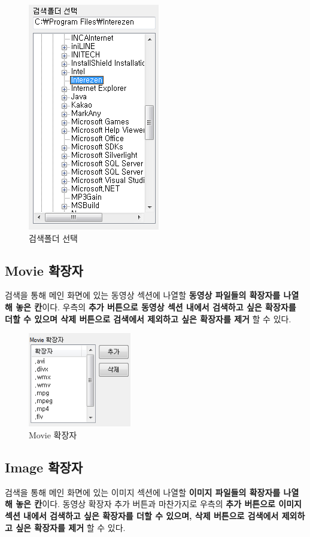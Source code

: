\documentclass[a4paper, 13pt]{article} %
\begin{document}
		\begin{figure}[h]
			\centering
			\includegraphics[height=0.35\textheight]{Figures/searchfolder}
			\caption{검색폴더 선택}
			\label{fig:searchfolder}
		\end{figure}
	
		\newpage
		
		\subsection{Movie 확장자}
		검색을 통해 메인 화면에 있는 동영상 섹션에 나열할 \textbf{동영상 파일들의 확장자를 나열해 놓은 칸}이다.
		우측의 \textbf{추가 버튼으로 동영상 섹션 내에서 검색하고 싶은 확장자를 더할 수 있으며 삭제 버튼으로 검색에서 제외하고 싶은 확장자를 제거} 할 수 있다.
		
		\begin{figure}[h]
			\centering
			\includegraphics[width=0.4\textwidth]{Figures/Movie}
			\caption{Movie 확장자}
			\label{fig:movie}
		\end{figure}
	
		\subsection{Image 확장자}
		검색을 통해 메인 화면에 있는 이미지 섹션에 나열할 \textbf{이미지 파일들의 확장자를 나열해 놓은 칸}이다. 동영상 확장자 추가 버튼과 마찬가지로 우측의 \textbf{추가 버튼으로 이미지 섹션 내에서 검색하고 싶은 확장자를 더할 수 있으며, 삭제 버튼으로 검색에서 제외하고 싶은 확장자를 제거} 할 수 있다.
		
\end{document}
